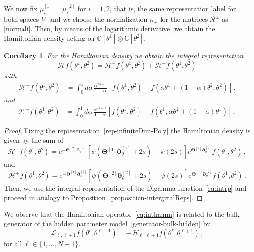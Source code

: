 \documentclass[11pt]{article}
\numberwithin{equation}{section}
\newtheorem{corollary}[theorem]{Corollary}
\newcommand{\N}{N}
\newcommand{\ecR}{\bm{\mathscr{R}}}
\newcommand{\ecH}{\bm{\mathscr{H}}}
\newcommand{\ecL}{\bm{\mathscr{L}}}
\newcommand{\hidden}{\theta}
\newcommand{\Hidden}{\Theta}
\begin{document}
We now fix $\mu_{i}^{[1]}=\mu_{i}^{[2]}$ for $i=1,2$, that is, the same representation label for both spaces $V_i$ and we choose the normalization $\kappa_{\pm}$ for the matrices $\ecR^{\pm}$ as \eqref{normali}. Then, by means of the logarithmic derivative, we obtain the Hamiltonian density acting on $\mathbb{C}[\hidden^1]\otimes \mathbb{C}[\hidden^2]$.
\begin{corollary}\label{cor:int}
 For the Hamiltonian density we obtain the integral representation
 \begin{equation}\label{eq:inthamm}
  \ecH f(\hidden^{1},\hidden^{2})=\ecH ^+f(\hidden^{1},\hidden^{2})+\ecH ^-f(\hidden^{1},\hidden^{2})
 \end{equation}
with
	\begin{equation}\label{redR2sl2int24}
			\begin{split}
				\ecH ^-f(\hidden^{1},\hidden^{2})&= \int_0^1d\alpha\,\frac{\alpha ^{2s-1}}{1-\alpha}\left[f(\hidden^{1},\hidden^{2})-f(\alpha \hidden^{1}+(1-\alpha )\hidden^{2},\hidden^{2})\right]\,.
			\end{split}
		\end{equation}
        and
\begin{equation}\label{redR2sl2int4}
			\begin{split}
				\ecH ^+ f(\hidden^{1},\hidden^{2})&= \int_0^1d\alpha\,\frac{\alpha ^{2s-1}}{1-\alpha }\left[f(\hidden^{1},\hidden^{2})-f(\hidden^{1},\alpha \hidden^{2}+(1-\alpha)\hidden^{1})\right]\,,
			\end{split}
		\end{equation}
\end{corollary}
\begin{proof}
Fixing the representation~\eqref{rep-infiniteDim-Poly} the Hamiltonian density is given by the sum of 
\begin{equation}			\ecH ^-f(\hidden^{1},\hidden^{2})=e^{-\bm{\Hidden}^{[2]}\bm{\partial}_{\hidden}^{[1]}}\left[\psi(\bm{\Hidden}^{[1]}\bm{\partial}_{\hidden}^{[1]}+2s)-\psi(2s)\right]e^{\bm{\Hidden}^{[2]}\bm{\partial}_{\hidden}^{[1]}}f(\hidden^{1},\hidden^{2})\,,
		\end{equation}
and
			\begin{equation}					\ecH ^+f(\hidden^{1},\hidden^{2}) = e^{-\bm{\Hidden}^{[1]}\bm{\partial}_{\hidden}^{[2]}}\left[\psi(\bm{\Hidden}^{[2]}\bm{\partial}_{\hidden}^{[2]}+2s)-\psi(2s)\right]e^{\bm{\Hidden}^{[1]}\bm{\partial}_{\hidden}^{[2]}}f(\hidden^{1},\hidden^{2})\,.
		\end{equation}
Then, we use the integral representation of the Digamma function~\eqref{eq:intrp} and proceed in analogy to Proposition~\ref{proposition-intergrtalReps}.
		\end{proof}
    We observe that the Hamiltonian operator~\eqref{eq:inthamm} is related to the bulk generator of the hidden parameter model~\eqref{generator-bulk-hidden} by
    \begin{equation}
    \ecL_{\ell,\ell+1}f(\hidden^{\ell},\hidden^{\ell+1})=-\ecH _{\ell,\ell+1}f(\hidden^{\ell},\hidden^{\ell+1})\,,
    \end{equation} for all $\ell\in\{1,\ldots, \N-1\}$.
\end{document}
